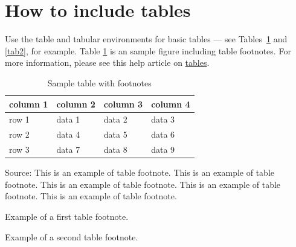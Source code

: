 \documentclass[12pt,a4paper]{article}
\begin{document}
\section{How to include tables}\label{sec5}

Use the table and tabular environments for basic tables --- see Tables~\ref{tab1} and \ref{tab2}, for example. Table \ref{tab1} is an sample figure including table footnotes. For more information, please see this help article on \href{https://www.overleaf.com/learn/latex/tables}{tables}. 

\begin{table}[!ht]
\caption{Sample table with footnotes\label{tab1}}
\begin{threeparttable}
\begin{tabular*}{\columnwidth}{@{\extracolsep\fill}llll@{\extracolsep\fill}}
\toprule
column 1 & column 2 & column 3 & column 4\\
\midrule
row 1 & data 1 & data 2 & data 3 \\
row 2 & data 4 & data 5\tnote{1} & data 6 \\
row 3 & data 7 & data 8 & data 9\tnote{2} \\
\bottomrule
\end{tabular*}
\begin{tablenotes}
\item Source: This is an example of table footnote. This is an example of table footnote. This is an example of table footnote. This is an example of table footnote. This is an example of table footnote.
\item[1] Example of a first table footnote.
\item[2] Example of a second table footnote.
\end{tablenotes}
\end{threeparttable}
\end{table}
\end{document}
